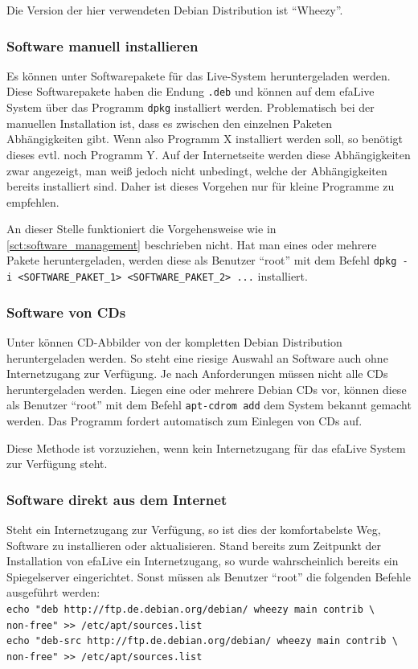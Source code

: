 \documentclass[a4paper,12pt,twoside]{article}
\begin{document}
Die Version der hier verwendeten Debian Distribution ist "`Wheezy"'.


\subsubsection{Software manuell installieren}
\label{sct:software_manuell}
Es können unter \cite{DEB3} Softwarepakete für das Live-System
heruntergeladen werden. Diese Softwarepakete haben die Endung
\texttt{.deb} und können auf dem efaLive System
über das Programm \texttt{dpkg} installiert werden. Problematisch bei der
manuellen Installation ist, dass es zwischen den einzelnen Paketen
Abhängigkeiten gibt. Wenn also Programm X installiert werden soll, so
benötigt dieses evtl. noch Programm Y. Auf der Internetseite werden
diese Abhängigkeiten zwar angezeigt, man weiß jedoch nicht unbedingt,
welche der Abhängigkeiten bereits installiert sind. Daher ist dieses
Vorgehen nur für kleine Programme zu empfehlen.

An dieser Stelle funktioniert die Vorgehensweise wie in \ref{sct:software_management}
beschrieben nicht. Hat man eines oder mehrere Pakete heruntergeladen,
werden diese als Benutzer "`root"' mit dem
Befehl \texttt{dpkg -i {\textless}SOFTWARE\_PAKET\_1{\textgreater}
{\textless}SOFTWARE\_PAKET\_2{\textgreater} ...} installiert. 


\subsubsection{Software von CDs}
\label{sct:software_cd}
Unter \cite{DEB4} können CD-Abbilder von der kompletten Debian
Distribution heruntergeladen werden. So steht eine riesige Auswahl an
Software auch ohne Internetzugang zur Verfügung. Je nach Anforderungen
müssen nicht alle CDs heruntergeladen werden. Liegen eine oder mehrere
Debian CDs vor, können diese als Benutzer
"`root"' mit dem Befehl
\texttt{apt-cdrom add} dem System bekannt gemacht
werden. Das Programm fordert automatisch zum Einlegen von CDs auf.

Diese Methode ist vorzuziehen, wenn kein Internetzugang für das efaLive
System zur Verfügung steht.


\subsubsection{Software direkt aus dem Internet}
\label{sct:software_internet}
Steht ein Internetzugang zur Verfügung, so ist dies der komfortabelste
Weg, Software zu installieren oder aktualisieren. Stand bereits zum
Zeitpunkt der Installation von efaLive ein Internetzugang, so wurde
wahrscheinlich bereits ein Spiegelserver eingerichtet. Sonst müssen als
Benutzer "`root"' die folgenden Befehle ausgeführt werden:
\bigskip
\\
\texttt{echo "deb http://ftp.de.debian.org/debian/ wheezy main contrib \textbackslash\\
    non-free"\ {\textgreater}{\textgreater} /etc/apt/sources.list}
\\
\texttt{echo "deb-src http://ftp.de.debian.org/debian/ wheezy main contrib \textbackslash\\
    non-free"\ {\textgreater}{\textgreater} /etc/apt/sources.list}
\end{document}

